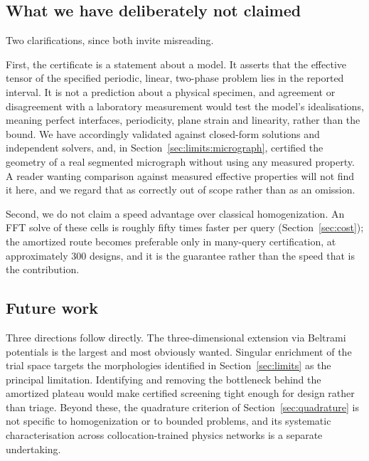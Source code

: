 \subsection{What we have deliberately not claimed}

Two clarifications, since both invite misreading.

First, the certificate is a statement about a model. It asserts that the
effective tensor of the specified periodic, linear, two-phase problem lies
in the reported interval. It is not a prediction about a physical specimen,
and agreement or disagreement with a laboratory measurement would test the
model's idealisations, meaning perfect interfaces, periodicity, plane strain
and linearity, rather than the bound. We have accordingly validated against
closed-form solutions and independent solvers, and, in
Section~\ref{sec:limits:micrograph}, certified the geometry of a real
segmented micrograph without using any measured property. A reader wanting
comparison against measured effective properties will not find it here, and
we regard that as correctly out of scope rather than as an omission.

Second, we do not claim a speed advantage over classical homogenization.
An FFT solve of these cells is roughly fifty times faster per query
(Section~\ref{sec:cost}); the amortized route becomes preferable only in
many-query certification, at approximately $300$ designs, and it is the
guarantee rather than the speed that is the contribution.

\subsection{Future work}

Three directions follow directly. The three-dimensional extension via
Beltrami potentials is the largest and most obviously wanted. Singular
enrichment of the trial space targets the morphologies identified in
Section~\ref{sec:limits} as the principal limitation. Identifying and
removing the bottleneck behind the amortized plateau would make certified
screening tight enough for design rather than triage. Beyond these, the
quadrature criterion of Section~\ref{sec:quadrature} is not specific to
homogenization or to bounded problems, and its systematic characterisation
across collocation-trained physics networks is a separate undertaking.

